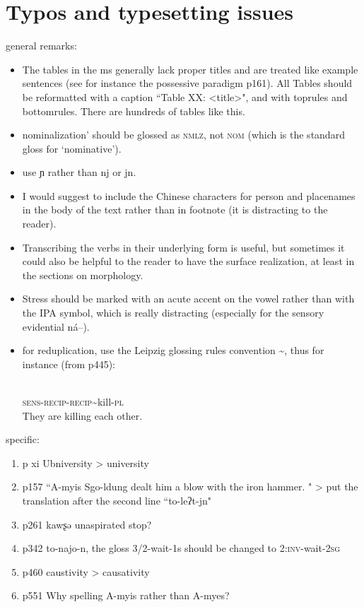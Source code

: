 \documentclass[oldfontcommands,oneside,a4paper,11pt]{article}
\newcommand{\ipa}[1]{{\phon \mbox{#1}}} %
\begin{document}
\section{Typos and typesetting issues}
general remarks:
\begin{itemize}
\item The tables in the ms generally lack proper titles and are treated like example sentences (see for instance the possessive paradigm p161). All Tables should be reformatted with a caption ``Table XX: <title>", and with toprules and bottomrules. There are hundreds of tables like this.
\item  nominalization' should be glossed as \textsc{nmlz}, not \textsc{nom} (which is the standard gloss for `nominative').

\item use \ipa{ɲ} rather than \ipa{nj} or \ipa{jn}.
\item I would suggest to include the Chinese characters for person and placenames in the body of the text rather than in footnote (it is distracting to the reader).
 \item Transcribing the verbs in their underlying form is useful, but sometimes it could also be helpful to the reader to have the surface realization, at least in the sections on morphology.
 \item Stress should be marked with an acute accent on the vowel rather than with the IPA symbol, which is really distracting (especially for the sensory evidential \ipa{ná--}).
 \item for reduplication, use the Leipzig glossing rules convention \textasciitilde{}, thus for instance (from p445):
\begin{exe}
\ex  
\gll \ipa{ná-ŋa-sa\textasciitilde{}sat-ɲ} \\
\textsc{sens-recip}-\textsc{recip}\textasciitilde{}kill-\textsc{pl} \\
\glt  They are killing each other. 
\end{exe} 
\end{itemize} 
 specific:
\begin{enumerate}
\item p xi Ubniversity > university
\item  p157 ``A-myis Sgo-ldung dealt him a blow with the iron hammer. " > put the translation after the second line ``to-leʔt-jn"
\item p261 \ipa{kawʂə} unaspirated stop?
\item p342 \ipa{to-najo-n}, the gloss 3/2-wait-1s should be changed to  \textsc{2:inv}-wait-\textsc{2sg}
\item p460 caustivity > causativity
\item p551 Why spelling A-myis rather  than A-myes?
\end{enumerate}  
  
  


\end{document}
